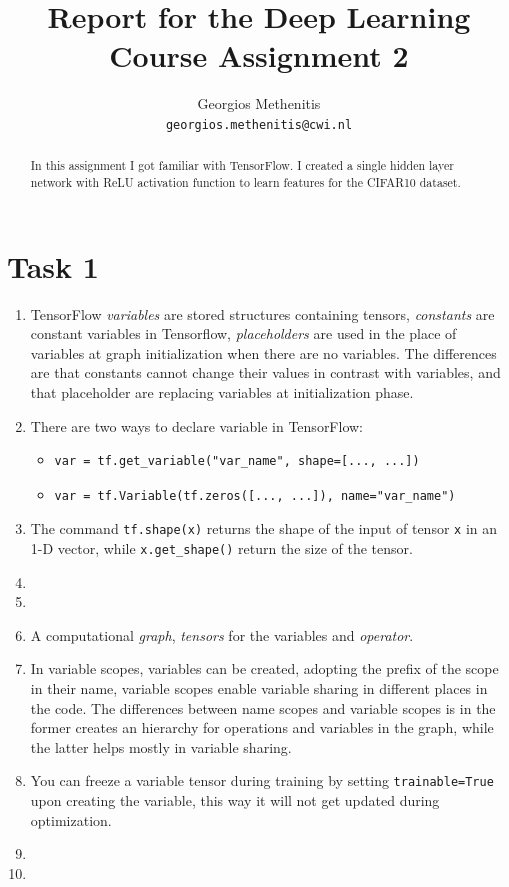 \documentclass{article}
\title{Report for the Deep Learning Course Assignment 2 }
\author{
  Georgios Methenitis \\
  \texttt{georgios.methenitis@cwi.nl}
}
\begin{document}

\maketitle

\begin{abstract}
In this assignment I got familiar with TensorFlow. I created a single hidden layer network with ReLU activation function to learn features for the CIFAR10 dataset.
\end{abstract}

\section{Task 1}
\begin{enumerate}
\item TensorFlow \emph{variables} are stored structures containing tensors, \emph{constants} are constant variables in Tensorflow, \emph{placeholders} are used in the place of variables at graph initialization when there are no variables. The differences are that constants cannot change their values in contrast with variables, and that placeholder are replacing variables at initialization phase.
\item There are two ways to declare variable in TensorFlow:
\begin{itemize}
\item \begin{small}
\begin{verbatim}
var = tf.get_variable("var_name", shape=[..., ...])
\end{verbatim}
\end{small}
\item \begin{small}
\begin{verbatim}
var = tf.Variable(tf.zeros([..., ...]), name="var_name")
\end{verbatim}
\end{small}
\end{itemize}

\item The command \texttt{tf.shape(x)} returns the shape of the input of tensor \texttt{x} in an 1-D vector, while \texttt{x.get\_shape()} return the size of the tensor.
\item
\item
\item A computational \emph{graph}, \emph{tensors} for the variables and \emph{operator}.
\item In variable scopes, variables can be created, adopting the prefix of the scope in their name, variable scopes enable variable sharing in different places in the code. The differences between name scopes and variable scopes is in the former creates an hierarchy for operations and variables in the graph, while the latter helps mostly in variable sharing.
\item You can freeze a variable tensor during training by setting \texttt{trainable=True} upon creating the variable, this way it will not get updated during optimization.
\item
\item
\end{enumerate}
\end{document}
